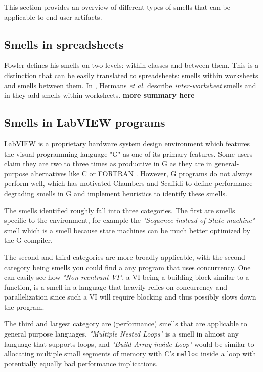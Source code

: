 \documentclass[10pt,conference,compsocconf]{IEEEtran}
\newcommand{\todo}[1]{\textbf{#1}}
\begin{document}
This section provides an overview of different types of smells that can be applicable to end-user artifacts.

\subsection{Smells in spreadsheets}
Fowler defines his smells on two levels: within classes and between them. This is a distinction that can be easily translated to spreadsheets: smells within worksheets and smells between them. In \cite{Hermans2012-2}, Hermans \emph{et al.} describe \emph{inter-worksheet} smells and in \cite{Hermans2012} they add smells within worksheets.
\todo{more summary here}

\subsection{Smells in LabVIEW programs}

LabVIEW is a proprietary hardware system design environment which features the visual programming language "G" as one of its primary features.
Some users claim they are two to three times as productive in G as they are in general-purpose alternatives like C or FORTRAN \cite{chambers2013smell}.
However, G programs do not always perform well, which has motivated Chambers and Scaffidi \cite{chambers2013smell} to define performance-degrading smells in G and implement heuristics to identify these smells.

The smells identified roughly fall into three categories. The first are smells specific to the environment, for example the \textit{"Sequence instead of State machine"} smell which is a smell because state machines can be much better optimized by the G compiler.

The second and third categories are more broadly applicable, with the second category being smells you could find a any program that uses concurrency.
One can easily see how \textit{"Non reentrant VI"}, a VI being a building block similar to a function, is a smell in a language that heavily relies on concurrency and parallelization since such a VI will require blocking and thus possibly slows down the program.

The third and largest category are (performance) smells that are applicable to general purpose languages.
\textit{"Multiple Nested Loops"} is a smell in almost any language that supports loops, and \textit{"Build Array inside Loop"} would be similar to allocating multiple small segments of memory with C's \texttt{malloc} inside a loop with potentially equally bad performance implications.
\end{document}
